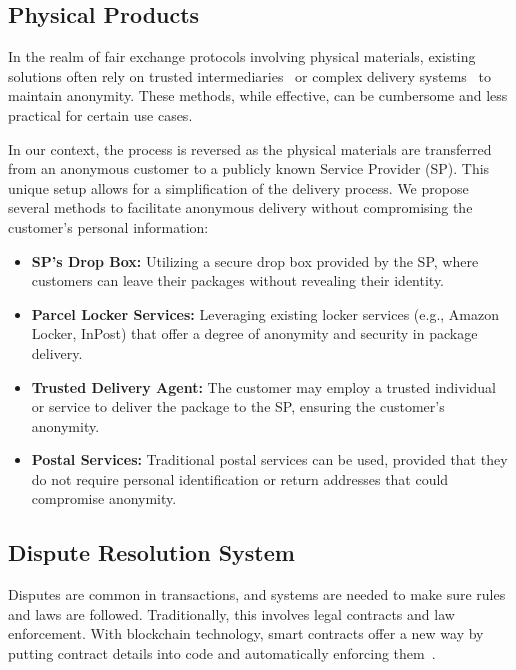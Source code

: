 \documentclass[pdftex,twocolumn,epjc3]{svjour3}
\begin{document}
\subsection{Physical Products}\label{sec:physical-products}
In the realm of fair exchange protocols involving physical materials, existing solutions often rely on trusted intermediaries~\cite{mohammedalarajFairnessPhysicalProducts2012, birjoveanuAnonymityFairexchangeEcommerce2015} or complex delivery systems~\cite{altawyLelantosBlockchainBasedAnonymous2017} to maintain anonymity. These methods, while effective, can be cumbersome and less practical for certain use cases.


In our context, the process is reversed as the physical materials are transferred from an anonymous customer to a publicly known Service Provider (SP). This unique setup allows for a simplification of the delivery process. We propose several methods to facilitate anonymous delivery without compromising the customer's personal information:

\begin{itemize}
    \item \textbf{SP's Drop Box:} Utilizing a secure drop box provided by the SP, where customers can leave their packages without revealing their identity.
    
    \item \textbf{Parcel Locker Services:} Leveraging existing locker services (e.g., Amazon Locker, InPost) that offer a degree of anonymity and security in package delivery.
    
    \item \textbf{Trusted Delivery Agent:} The customer may employ a trusted individual or service to deliver the package to the SP, ensuring the customer's anonymity.
    
    \item \textbf{Postal Services:} Traditional postal services can be used, provided that they do not require personal identification or return addresses that could compromise anonymity.
\end{itemize}

\subsection{Dispute Resolution System}
\label{sec:dispute-resolution}
\begin{sloppypar}
Disputes are common in transactions, and systems are needed to make sure rules and laws are followed. Traditionally, this involves legal contracts and law enforcement. With blockchain technology, smart contracts offer a new way by putting contract details into code and automatically enforcing them~\cite{allenGovernanceBlockchainDispute2019}.
\end{sloppypar}
\end{document}
